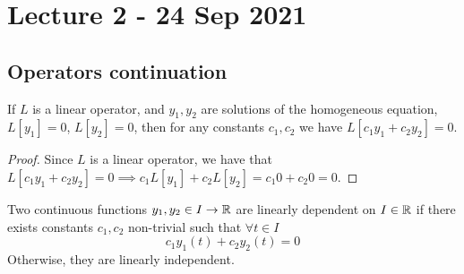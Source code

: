 \section{Lecture 2 - 24 Sep 2021}
\subsection{Operators continuation}
\begin{theorem} 
  If $L$ is a linear operator, and $y_1, y_2$ are solutions of the homogeneous equation,
  $L[y_1]=0$, $L[y_2]=0$, then for any constants $c_1,c_2$ we have $L[c_1y_1+c_2y_2]=0$.
\end{theorem}
\begin{proof}
  Since $L$ is a linear operator, we have that $L[c_1y_1+c_2y_2]=0 \implies
  c_1L[y_1]+c_2L[y_2]=c_1 0 + c_2 0 = 0$.
\end{proof}

\begin{definition}
  Two continuous functions $y_1,y_2\in I\to \mathbb R$ are linearly dependent on $I\in\mathbb R$ if
  there exists constants $c_1, c_2$ non-trivial such that $\forall t\in I$ 
  \[ c_1 y_1(t) + c_2 y_2(t) =0 \]
  Otherwise, they are linearly independent.
  \label{linearDependenceFunctions}
\end{definition}

